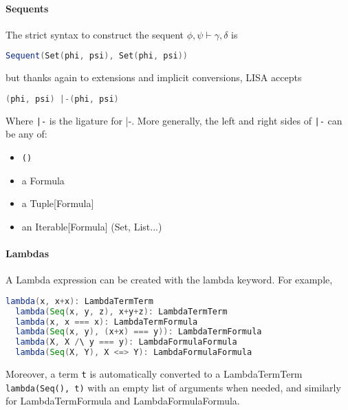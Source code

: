 \paragraph{Sequents}
The strict syntax to construct the sequent $\phi, \psi \vdash \gamma, \delta$ is
\begin{lstlisting}[language=Scala]
  Sequent(Set(phi, psi), Set(phi, psi))
\end{lstlisting}
but thanks again to  extensions and implicit conversions, LISA accepts
\begin{lstlisting}[language=Scala]
  (phi, psi) |-(phi, psi)
\end{lstlisting}
Where \lstinline{|-} is the ligature for |-. More generally, the left and right sides of \lstinline{|-} can be any of:
\vspace*{-0.7em}
\begin{itemize}
  \setlength\itemsep{-0.5em}
  \item \lstinline|()|
  \item a Formula
  \item a Tuple[Formula]
  \item an Iterable[Formula] (Set, List...)
\end{itemize}
\paragraph{Lambdas}
A Lambda expression can be created with the lambda keyword. For example, 
\begin{lstlisting}[language=Scala]
  lambda(x, x+x): LambdaTermTerm
  lambda(Seq(x, y, z), x+y+z): LambdaTermTerm
  lambda(x, x === x): LambdaTermFormula
  lambda(Seq(x, y), (x+x) === y)): LambdaTermFormula
  lambda(X, X /\ y === y): LambdaFormulaFormula
  lambda(Seq(X, Y), X <=> Y): LambdaFormulaFormula
\end{lstlisting}
Moreover, a term \lstinline|t| is automatically converted to a LambdaTermTerm \lstinline|lambda(Seq(), t)| with an empty list of arguments when needed, and similarly for LambdaTermFormula and LambdaFormulaFormula.

\vspace{2em}
